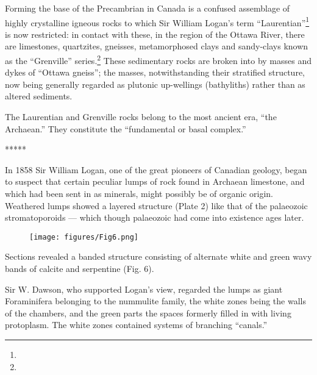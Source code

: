 \documentclass[a4paper, 12pt, oneside]{article}
\begin{document}
Forming the base of the Precambrian in Canada is a confused assemblage of highly crystalline igneous rocks to which Sir William Logan's term ``Laurentian''\footnote{} is now restricted: in contact with these, in the region of the Ottawa River, there are limestones, quartzites, gneisses, metamorphosed clays and sandy-clays known as the ``Grenville'' series.\footnote{} These sedimentary rocks are broken into by masses and dykes of ``Ottawa gneiss''; the masses, notwithstanding their stratified structure, now being generally regarded as plutonic up-wellings (bathyliths) rather than as altered sediments.

The Laurentian and Grenville rocks belong to the most ancient era, ``the Archaean.'' They constitute the ``fundamental or basal complex.''

\centerline{*\hspace{15mm}*\hspace{15mm}*\hspace{15mm}*\hspace{15mm}*}
\bigskip

In 1858 Sir William Logan, one of the great pioneers of Canadian geology, began to suspect that certain peculiar lumps of rock found in Archaean limestone, and which had been sent in as minerals, might possibly be of organic origin. Weathered lumps showed a layered structure (Plate 2) like that of the palaeozoic stromatoporoids --- which though palaeozoic had come into existence ages later.
\begin{figure}[H]
\centering
\texttt{[image: figures/Fig6.png]}
\caption*{}
\end{figure}
Sections revealed a banded structure consisting of alternate white and green wavy bands of calcite and serpentine (Fig. 6).

Sir W. Dawson, who supported Logan's view, regarded the lumps as giant Foraminifera belonging to the nummulite family, the white zones being the walls of the chambers, and the green parts the spaces formerly filled in with living protoplasm. The white zones contained systems of branching ``canals.''
\end{document}

